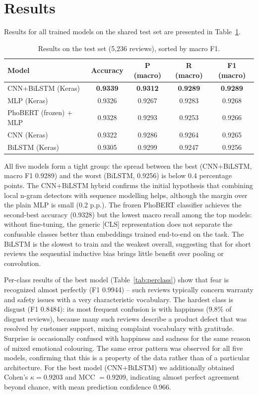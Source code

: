 \documentclass[11pt]{article}
\begin{document}
\section{Results}
Results for all trained models on the shared test set are presented in Table~\ref{tab:results}.

\begin{table}[h]
\centering
\caption{Results on the test set (5,236 reviews), sorted by macro F1.}
\label{tab:results}
\begin{tabular}{lcccc}
\hline
Model & Accuracy & P (macro) & R (macro) & F1 (macro) \\
\hline
CNN+BiLSTM (Keras) & \textbf{0.9339} & \textbf{0.9312} & \textbf{0.9289} & \textbf{0.9289} \\
MLP (Keras) & 0.9326 & 0.9267 & 0.9283 & 0.9268 \\
PhoBERT (frozen) + MLP & 0.9328 & 0.9293 & 0.9253 & 0.9266 \\
CNN (Keras) & 0.9322 & 0.9286 & 0.9264 & 0.9265 \\
BiLSTM (Keras) & 0.9305 & 0.9299 & 0.9247 & 0.9256 \\
\hline
\end{tabular}
\end{table}

All five models form a tight group: the spread between the best (CNN+BiLSTM, macro F1 0.9289) and the worst (BiLSTM, 0.9256) is below 0.4 percentage points. The CNN+BiLSTM hybrid confirms the initial hypothesis that combining local n-gram detectors with sequence modelling helps, although the margin over the plain MLP is small (0.2 p.p.). The frozen PhoBERT classifier achieves the second-best accuracy (0.9328) but the lowest macro recall among the top models: without fine-tuning, the generic [CLS] representation does not separate the confusable classes better than embeddings trained end-to-end on the task. The BiLSTM is the slowest to train and the weakest overall, suggesting that for short reviews the sequential inductive bias brings little benefit over pooling or convolution.

Per-class results of the best model (Table~\ref{tab:perclass}) show that fear is recognized almost perfectly (F1 0.9944) -- such reviews typically concern warranty and safety issues with a very characteristic vocabulary. The hardest class is disgust (F1 0.8484): its most frequent confusion is with happiness (9.8\% of disgust reviews), because many such reviews describe a product defect that was resolved by customer support, mixing complaint vocabulary with gratitude. Surprise is occasionally confused with happiness and sadness for the same reason of mixed emotional colouring. The same error pattern was observed for all five models, confirming that this is a property of the data rather than of a particular architecture. For the best model (CNN+BiLSTM) we additionally obtained Cohen's $\kappa = 0.9203$ and MCC $= 0.9209$, indicating almost perfect agreement beyond chance, with mean prediction confidence 0.966.
\end{document}
